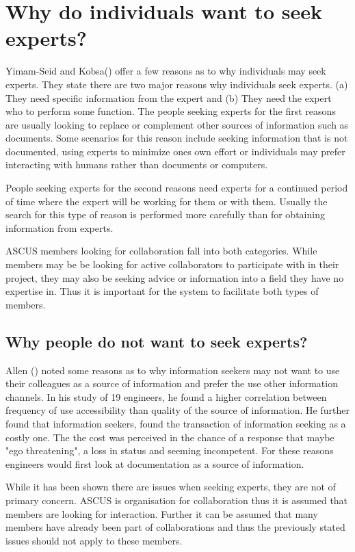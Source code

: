\documentclass[a4paper,oneside,11pt]{report}
\begin{document}
\section{Why do individuals want to seek experts?}
Yimam-Seid and Kobsa(\citeyear{kobsaseid2003}) offer a few reasons as to why individuals may seek experts. They state there are two major reasons why individuals seek experts. (a) They need specific information from the expert and (b) They need the expert who to perform some function. The people seeking experts for the first reasons are usually looking to replace or complement other sources of information such as documents. Some scenarios for this reason include seeking information that is not documented, using experts to minimize ones own effort or individuals may prefer interacting with humans rather than documents or computers. 

People seeking experts for the second reasons need experts for a continued period of time where the expert will be working for them or with them. Usually the search for this type of reason is performed more carefully than for obtaining information from experts.

ASCUS members looking for collaboration fall into both categories. While members may be be looking for active collaborators to participate with in their project, they may also be seeking advice or information into a field they have no expertise in. Thus it is important for the system to facilitate both types of members.

\subsection{Why people do not want to seek experts?}
Allen (\citeyear{allen1977}) noted some reasons as to why information seekers may not want to use their colleagues as a source of information and prefer the use other information channels. In his study of 19 engineers, he found a higher correlation between frequency of use accessibility than quality of the source of information. He further found that information seekers, found the transaction of information seeking as a costly one. The the cost was perceived in the chance of a response that maybe "ego threatening", a loss in status and seeming incompetent. For these reasons engineers would first look at documentation as a source of information. 

While it has been shown there are issues when seeking experts, they are not of primary concern. ASCUS is organisation for collaboration thus it is assumed that members are looking for interaction. Further it can be assumed that many members have already been part of collaborations and thus the previously stated issues should not apply to these members.
\end{document}
